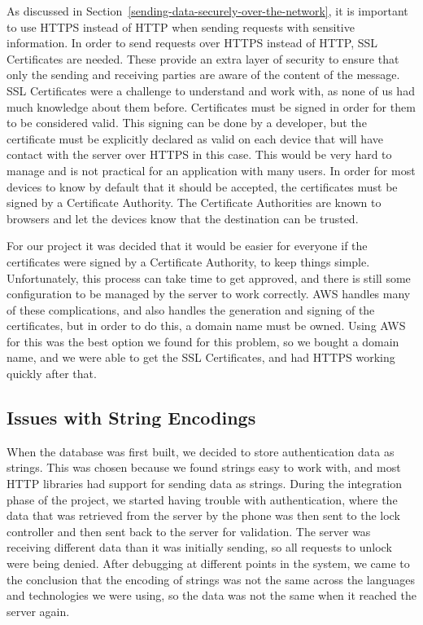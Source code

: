 \documentclass[12pt]{report}
\let\Oldsubsection\subsection
\renewcommand{\subsection}{\FloatBarrier\Oldsubsection}
\begin{document}
As discussed in Section~\ref{sending-data-securely-over-the-network}, it is important to use HTTPS
instead of HTTP when sending requests with sensitive information.
In order to send requests over HTTPS instead of HTTP, SSL Certificates are needed.
These provide an extra layer of security to ensure that only the sending and receiving parties are
aware of the content of the message.
SSL Certificates were a challenge to understand and work with, as none of us had much
knowledge about them before. Certificates must be signed in order for them to be considered
valid. This signing can be done by a developer, but the certificate must be explicitly declared as
valid on each device that will have contact with the server over HTTPS in this case. This would
be very hard to manage and is not practical for an application with many users. In order for most
devices to know by default that it should be accepted, the certificates must be signed by a
Certificate Authority. The Certificate Authorities are known to browsers and let the devices know
that the destination can be trusted.

For our project it was decided that it would be easier for everyone if the certificates were
signed by a Certificate Authority, to keep things simple. Unfortunately, this process can take
time to get approved, and there is still some configuration to be managed by the server to work
correctly. AWS handles many of these complications, and also handles the generation and
signing of the certificates, but in order to do this, a domain name must be owned. Using AWS for
this was the best option we found for this problem, so we bought a domain name, and we were
able to get the SSL Certificates, and had HTTPS working quickly after that.


\subsection{Issues with String Encodings} \label{issues-with-string-encodings}

When the database was first built, we decided to store authentication data as strings. This
was chosen because we found strings easy to work with, and most HTTP libraries had support
for sending data as strings. During the integration phase of the project, we started having trouble
with authentication, where the data that was retrieved from the server by the phone was then sent
to the lock controller and then sent back to the server for validation. The server was receiving
different data than it was initially sending, so all requests to unlock were being denied. After
debugging at different points in the system, we came to the conclusion that the encoding of
strings was not the same across the languages and technologies we were using, so the data was
not the same when it reached the server again.
\end{document}
